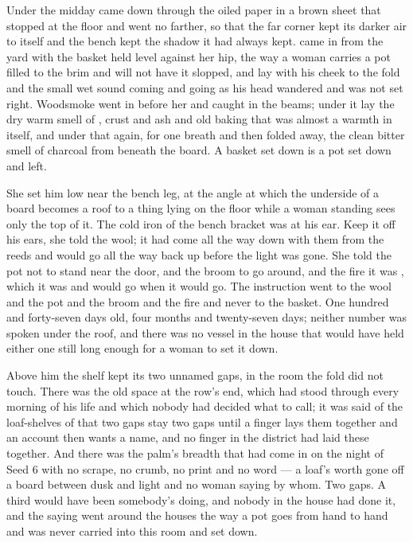 Under  the midday came down through the oiled paper in a brown sheet that stopped at the floor and went no farther, so that the far corner kept its darker air to itself and the bench kept the shadow it had always kept.  came in from the yard with the basket held level against her hip, the way a woman carries a pot filled to the brim and will not have it slopped, and  lay with his cheek to the fold and the small wet sound coming and going as his head wandered and was not set right. Woodsmoke went in before her and caught in the beams; under it lay the dry warm smell of , crust and ash and old baking that was almost a warmth in itself, and under that again, for one breath and then folded away, the clean bitter smell of charcoal from beneath the board. A basket set down is a pot set down and left.

She set him low near the bench leg, at the angle at which the underside of a board becomes a roof to a thing lying on the floor while a woman standing sees only the top of it. The cold iron of the bench bracket was at his ear. Keep it off his ears, she told the wool; it had come all the way down with them from the reeds and would go all the way back up before the light was gone. She told the pot not to stand near the door, and the broom to go around, and the fire it was , which it was and would go when it would go. The instruction went to the wool and the pot and the broom and the fire and never to the basket. One hundred and forty-seven days old, four months and twenty-seven days; neither number was spoken under the roof, and there was no vessel in the house that would have held either one still long enough for a woman to set it down.

Above him the shelf kept its two unnamed gaps, in the room the fold did not touch. There was the old space at the row's end, which had stood through every morning of his life and which nobody had decided what to call; it was said of the loaf-shelves of  that two gaps stay two gaps until a finger lays them together and an account then wants a name, and no finger in the district had laid these together. And there was the palm's breadth that had come in on the night of Seed 6 with no scrape, no crumb, no print and no word --- a loaf's worth gone off a board between dusk and light and no woman saying by whom. Two gaps. A third would have been somebody's doing, and nobody in the house had done it, and the saying went around the houses the way a pot goes from hand to hand and was never carried into this room and set down.

